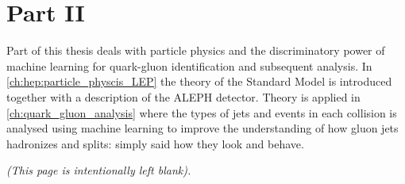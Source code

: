 \documentclass[a4paper, twoside, nobib, justified]{tufte-book} %
\makeatletter
\newcommand{\RNum}[1]{\uppercase\expandafter{\romannumeral #1\relax}}
\newcommand*{\blankpage}{%
\vspace*{\fill}
{\centering \textit{(This page is intentionally left blank).}\par}
\vspace{\fill}}
\renewcommand*{\cleardoublepage}{\clearpage\if@twoside \ifodd\c@page\else
\blankpage
\thispagestyle{empty}
\newpage
\if@twocolumn\hbox{}\newpage\fi\fi\fi}
\makeatother
\begin{document}
\chapter*{Part II}
Part \RNum{2} of this thesis deals with particle physics and the discriminatory power of machine learning for quark-gluon identification and subsequent analysis. In \autoref{ch:hep:particle_physcis_LEP} the theory of the Standard Model is introduced together with a description of the ALEPH detector. Theory is applied in \autoref{ch:quark_gluon_analysis} where the types of jets and events in each collision is analysed using machine learning to improve the understanding of how gluon jets hadronizes and splits: simply said how they look and behave. 






\appendix




\backmatter

\begin{fullwidth}
\listoffigures
{}
\end{fullwidth}

\begin{fullwidth}
\listoftables
{}
\end{fullwidth}


\cleardoublepage
{}
{}


\printindex
\end{document}
